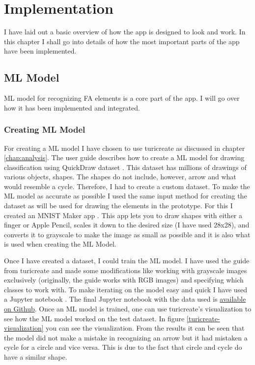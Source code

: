 \chapter{Implementation}
\label{chap:implementation}

I have laid out a basic overview of how the app is designed to look and work. In this chapter I shall go into details of how the most important parts of the app have been implemented.

\section{ML Model}

ML model for recognizing FA elements is a core part of the app. I will go over how it has been implemented and integrated.

\subsection{Creating ML Model}

For creating a ML model I have chosen to use turicreate \cite{turicreate} as discussed in chapter \ref{chap:analysis}. The user guide \cite{drawing-classification} describes how to create a ML model for drawing classification using QuickDraw dataset \cite{quickdraw}. This dataset has millions of drawings of various objects, shapes. The shapes do not include, however, arrow and what would resemble a cycle. Therefore, I had to create a custom dataset. To make the ML model as accurate as possible I used the same input method for creating the dataset as will be used for drawing the elements in the prototype. For this I created an MNIST Maker app \cite{mnist-maker}. This app lets you to draw shapes with either a finger or Apple Pencil, scales it down to the desired size (I have used 28x28), and converts it to grayscale to make the image as small as possible and it is also what is used when creating the ML Model.

Once I have created a dataset, I could train the ML model. I have used the guide from turicreate and made some modifications like working with grayscale images exclusively (originally, the guide works with RGB images) and specifying which classes to work with. To make iterating on the model easy and quick I have used a Jupyter notebook \cite{jupyter}. The final Jupyter notebook with the data used is \href{https://github.com/fortmarek/automata-editor-model/}{available on Github}. Once an ML model is trained, one can use turicreate's visualization to see how the ML model worked on the test dataset. In figure \ref{turicreate-visualization} you can see the visualization. From the results it can be seen that the model did not make a mistake in recognizing an arrow but it had mistaken a cycle for a circle and vice versa. This is due to the fact that circle and cycle do have a similar shape.

